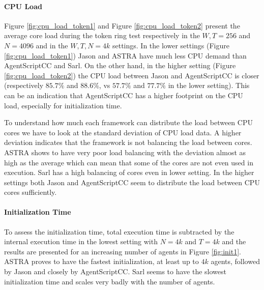\paragraph{CPU Load} Figure \ref{fig:cpu_load_token1} and Figure \ref{fig:cpu_load_token2} present the average core load during the token ring test respectively in the $W,T=256$ and $N=4096$ and in the $W,T,N=4k$ settings. %
In the lower settings (Figure \ref{fig:cpu_load_token1}) Jason and ASTRA have much less CPU demand than AgentScriptCC and Sarl. On the other hand, in the higher setting (Figure \ref{fig:cpu_load_token2}) the CPU load between Jason and AgentScriptCC is closer (respectively $85.7\%$ and $88.6\%$, vs $57.7\%$ and $77.7\%$ in the lower setting). %
This can be an indication that AgentScriptCC has a higher footprint on the CPU load, especially for initialization time. 

To understand how much each framework can distribute the load between CPU cores we have to look at the standard deviation of CPU load data. A higher deviation %
indicates that the framework is not balancing the load between cores. ASTRA shows to have very poor load balancing with the deviation almost as high as the average which can mean that some of the cores are not even used in execution. Sarl has a high balancing of cores even in lower setting. In the higher settings both Jason and AgentScriptCC seem to distribute the load between CPU cores sufficiently.

\paragraph{Initialization Time}
To assess the initialization time, total execution time is subtracted by the internal execution time in the lowest setting with $N=4k$ and $T=4k$ and the results are presented for an increasing number of agents in Figure \ref{fig:init1}. ASTRA proves to have the fastest initialization, at least up to $4k$ agents, followed by Jason and closely by AgentScriptCC. Sarl seems to have the slowest initialization time and scales very badly with the number of agents. 

